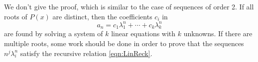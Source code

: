 

\setcounter{section}{1}
\setcounter{subsection}{4}
\setcounter{dfn}{7}

We don't give the proof, which is similar to the case of sequences of order 2.
If all roots of $P(x)$ are distinct, then the coefficients $c_i$ in
\[
a_n = c_1 \lambda_1^n + \cdots + c_k \lambda_k^n
\]
are found by solving a system of $k$ linear equations with $k$ unknowns.
If there are multiple roots, some work should be done in order to prove that the sequences $n^j \lambda_i^n$ satisfy
the recursive relation \eqref{eqn:LinReck}.



